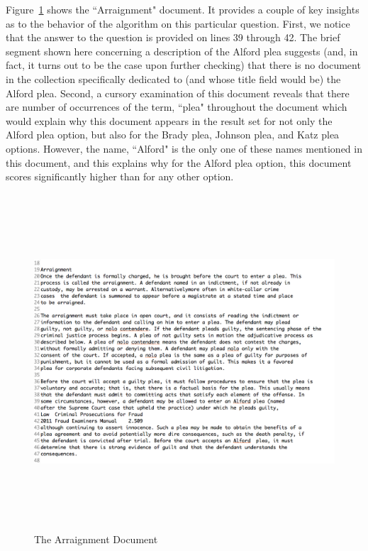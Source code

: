 Figure~\ref{fig:concept_match_v3_example_document} shows the ``Arraignment" document.  It provides a couple of key insights as to the behavior of the algorithm on this particular question.  First, we notice that the answer to the question is provided on lines 39 through 42.  The brief segment shown here concerning a description of the Alford plea suggests (and, in fact, it turns out to be the case upon further checking) that there is no document in the collection specifically dedicated to (and whose title field would be) the Alford plea.  Second, a cursory examination of this document reveals that there are number of occurrences of the term, ``plea" throughout the document which would explain why this document appears in the result set for not only the Alford plea option, but also for the Brady plea, Johnson plea, and Katz plea options.  However, the name, ``Alford" is the only one of these names mentioned in this document, and this explains why for the Alford plea option, this document scores significantly higher than for any other option.

\begin{figure}
\centering
\vspace{0.75in}
\includegraphics[width=125mm, height=125mm]{concept_match_v3_example_document.png}
\caption{The Arraignment Document}
\label{fig:concept_match_v3_example_document}
\end{figure}


